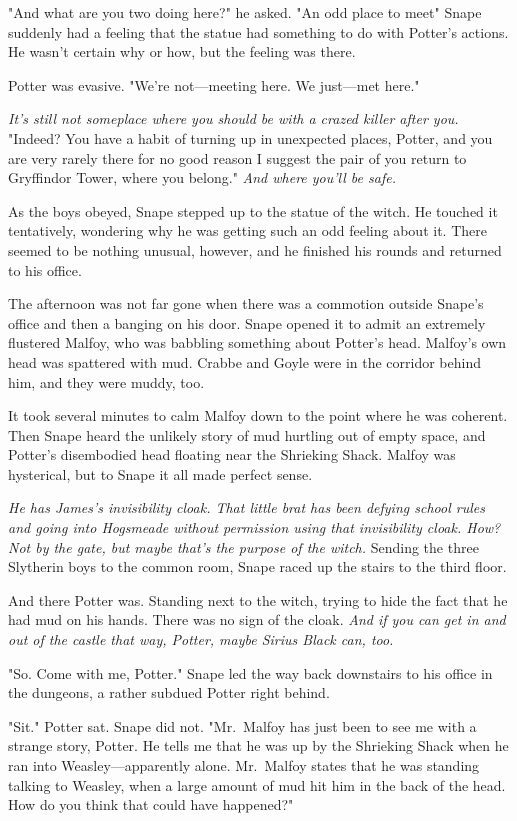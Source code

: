 "And what are you two doing here?" he asked. "An odd place to meet{\el}" Snape suddenly had a feeling that the statue had something to do with Potter's actions. He wasn't certain why or how, but the feeling was there.

Potter was evasive. "We're not—meeting here. We just—met here."

\emph{It's still not someplace where you should be with a crazed killer after you.} "Indeed? You have a habit of turning up in unexpected places, Potter, and you are very rarely there for no good reason{\el} I suggest the pair of you return to Gryffindor Tower, where you belong." \emph{And where you'll be safe.}

As the boys obeyed, Snape stepped up to the statue of the witch. He touched it tentatively, wondering why he was getting such an odd feeling about it. There seemed to be nothing unusual, however, and he finished his rounds and returned to his office.

The afternoon was not far gone when there was a commotion outside Snape's office and then a banging on his door. Snape opened it to admit an extremely flustered Malfoy, who was babbling something about Potter's head. Malfoy's own head was spattered with mud. Crabbe and Goyle were in the corridor behind him, and they were muddy, too.

It took several minutes to calm Malfoy down to the point where he was coherent. Then Snape heard the unlikely story of mud hurtling out of empty space, and Potter's disembodied head floating near the Shrieking Shack. Malfoy was hysterical, but to Snape it all made perfect sense.

\emph{He has James's invisibility cloak. That little brat has been defying school rules and going into Hogsmeade without permission using that invisibility cloak. How{\el}? Not by the gate, but maybe that's the purpose of the witch.} Sending the three Slytherin boys to the common room, Snape raced up the stairs to the third floor.

And there Potter was. Standing next to the witch, trying to hide the fact that he had mud on his hands. There was no sign of the cloak. \emph{And if you can get in and out of the castle that way, Potter, maybe Sirius Black can, too.}

"So. Come with me, Potter." Snape led the way back downstairs to his office in the dungeons, a rather subdued Potter right behind.

"Sit." Potter sat. Snape did not. "Mr.~Malfoy has just been to see me with a strange story, Potter. He tells me that he was up by the Shrieking Shack when he ran into Weasley—apparently alone. Mr.~Malfoy states that he was standing talking to Weasley, when a large amount of mud hit him in the back of the head. How do you think that could have happened?"

